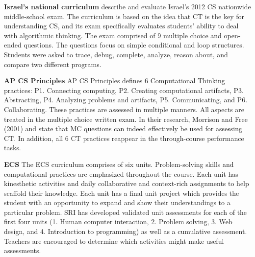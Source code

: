 \noindent\textbf{Israel's national curriculum}
 describe and evaluate Israel's 2012 CS nationwide middle-school exam. The curriculum is based on the idea that CT is the key for understanding CS, and its exam specifically evaluates students' ability to deal with algorithmic thinking. The exam comprised of 9 multiple choice and open-ended questions. The questions focus on simple conditional and loop structures. Students were asked to trace, debug, complete, analyze, reason about, and compare two different programs.

\noindent\textbf{AP CS Principles}
AP CS Principles defines 6 Computational Thinking practices: P1. Connecting computing, P2. Creating computational artifacts, P3. Abstracting, P4. Analyzing problems and artifacts, P5. Communicating, and P6. Collaborating. These practices are assessed in multiple manners. All aspects are treated in the multiple choice written exam. In their research, Morrison and Free (2001) and \cite{2010TewGuzdial} state that MC questions can indeed effectively be used for assessing CT. In addition, all 6 CT practices reappear in the through-course performance tasks.

\noindent\textbf{ECS}
The ECS  curriculum comprises of six units. Problem-solving skills and computational practices are emphasized throughout the course. Each unit has kinesthetic activities and daily collaborative and context-rich assignments to help scaffold their knowledge. Each unit has a final unit project which provides the student with an opportunity to expand and show their understandings to a particular problem. SRI has developed validated unit assessments for each of the first four units (1. Human computer interaction, 2. Problem solving, 3. Web design, and 4. Introduction to programming) as well as a cumulative assessment. Teachers are encouraged to determine which activities might make useful assessments.

%
%
%
%
%

